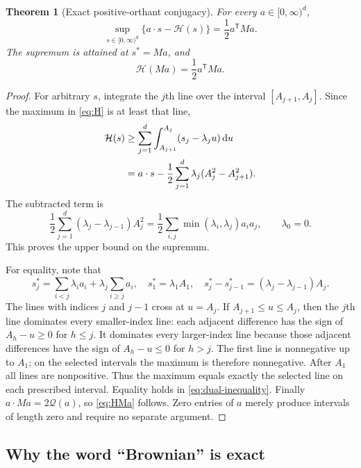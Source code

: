 \documentclass[11pt,a4paper]{article}
\numberwithin{equation}{section}
\newtheorem{theorem}{Theorem}[section]
\theoremstyle{definition}
\theoremstyle{remark}\newtheorem{remark}[theorem]{Remark}
\newcommand{\dd}{\,\mathrm d}
\newcommand{\He}{\mathcal H}
\newcommand{\Qf}{\mathcal Q}
\begin{document}
\begin{theorem}[Exact positive-orthant conjugacy]
\label{thm:dual}
For every $a\in[0,\infty)^d$,
\begin{equation}
 \boxed{\sup_{s\in[0,\infty)^d}\{a\cdot s-\He(s)\}
       =\frac12a^{\mathsf T}Ma.}
 \label{eq:dual}
\end{equation}
The supremum is attained at $s^*=Ma$, and
\begin{equation}
 \He(Ma)=\frac12a^{\mathsf T}Ma.
 \label{eq:HMa}
\end{equation}
\end{theorem}
\begin{proof}
For arbitrary $s$, integrate the $j$th line over the interval
$[A_{j+1},A_j]$. Since the maximum in \eqref{eq:H} is at least that line,
\begin{align}
 \He(s)&\ge\sum_{j=1}^d\int_{A_{j+1}}^{A_j}(s_j-\lambda_ju)\dd u\notag\\
 &=a\cdot s-\frac12\sum_{j=1}^d\lambda_j(A_j^2-A_{j+1}^2).
 \label{eq:dual-inequality}
\end{align}
The subtracted term is
\begin{equation}
 \frac12\sum_{j=1}^d(\lambda_j-\lambda_{j-1})A_j^2
 =\frac12\sum_{i,j}\min(\lambda_i,\lambda_j)a_ia_j,
 \qquad \lambda_0=0.
 \label{eq:increments}
\end{equation}
This proves the upper bound on the supremum.

For equality, note that
\begin{equation}
 s_j^*=\sum_{i<j}\lambda_ia_i+\lambda_j\sum_{i\ge j}a_i,
 \quad s_1^*=\lambda_1A_1,
 \quad s_j^*-s_{j-1}^*=(\lambda_j-\lambda_{j-1})A_j.
 \label{eq:star}
\end{equation}
The lines with indices $j$ and $j-1$ cross at $u=A_j$. If
$A_{j+1}\le u\le A_j$, then the $j$th line dominates every smaller-index
line: each adjacent difference has the sign of $A_h-u\ge0$ for $h\le j$.
It dominates every larger-index line because those adjacent differences
have the sign of $A_h-u\le0$ for $h>j$.
The first line is nonnegative up to $A_1$; on the selected intervals the
maximum is therefore nonnegative. After $A_1$ all lines are nonpositive.
Thus the maximum equals exactly the selected line on each prescribed
interval. Equality holds in \eqref{eq:dual-inequality}.
Finally $a\cdot Ma=2\Qf(a)$, so \eqref{eq:HMa} follows. Zero entries of $a$
merely produce intervals of length zero and require no separate argument.
\end{proof}

\subsection{Why the word ``Brownian'' is exact}
\end{document}
